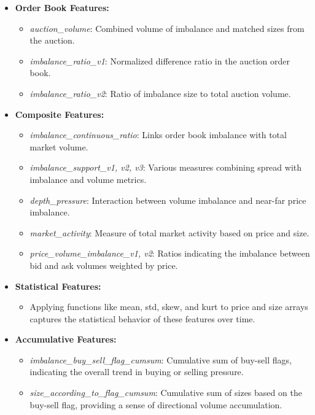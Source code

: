 \documentclass[12pt]{article}
\newtheorem{Proof of Lemma}{Proof of Lemma}
\begin{document}
\begin{itemize}
  \item \textbf{Order Book Features:}
  \begin{itemize}
  \item \textit{auction\_volume}: Combined volume of imbalance and matched sizes from the auction.
  \item \textit{imbalance\_ratio\_v1}: Normalized difference ratio in the auction order book.
  \item \textit{imbalance\_ratio\_v2}: Ratio of imbalance size to total auction volume.
  \end{itemize}
  
  \item \textbf{Composite Features:}
  \begin{itemize}
  \item \textit{imbalance\_continuous\_ratio}: Links order book imbalance with total market volume.
  \item \textit{imbalance\_support\_v1, v2, v3}: Various measures combining spread with imbalance and volume metrics.
  \item \textit{depth\_pressure}: Interaction between volume imbalance and near-far price imbalance.
  \item \textit{market\_activity}: Measure of total market activity based on price and size.
  \item \textit{price\_volume\_imbalance\_v1, v2}: Ratios indicating the imbalance between bid and ask volumes weighted by price.
  \end{itemize}
  
  \item \textbf{Statistical Features:}
  \begin{itemize}
  \item Applying functions like mean, std, skew, and kurt to price and size arrays captures the statistical behavior of these features over time.
  \end{itemize}
  
  \item \textbf{Accumulative Features:}
  \begin{itemize}
  \item \textit{imbalance\_buy\_sell\_flag\_cumsum}: Cumulative sum of buy-sell flags, indicating the overall trend in buying or selling pressure.
  \item \textit{size\_according\_to\_flag\_cumsum}: Cumulative sum of sizes based on the buy-sell flag, providing a sense of directional volume accumulation.
  \end{itemize}
\end{itemize}
\end{document}
